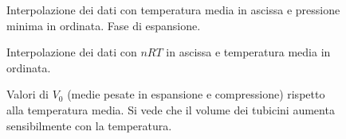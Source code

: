 \documentclass[italian,a4paper]{article}
\begin{document}
\begin{figure}[p]\caption{Interpolazione dei dati con temperatura media in ascissa e pressione minima in ordinata. Fase di espansione.}\label{t-pminesp}

\end{figure}
\begin{figure}[p]\caption{Interpolazione dei dati con $nRT$ in ascissa e temperatura media in ordinata.}\label{t-pv}

\end{figure}
\begin{figure}[p]\caption{Valori di $V_0$ (medie pesate in espansione e compressione) rispetto alla temperatura media. Si vede che il volume dei tubicini aumenta sensibilmente con la temperatura.}\label{t-v0}

\end{figure}
\end{document}
